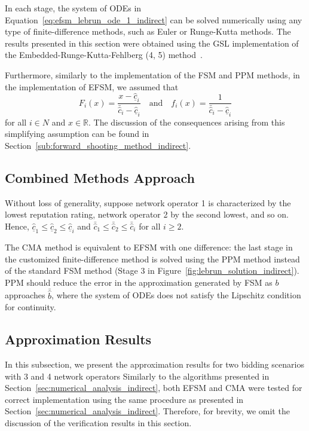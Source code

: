 In each stage, the system of ODEs in Equation~\eqref{eq:efsm_lebrun_ode_1_indirect} can be solved numerically using any type of finite-difference methods, such as Euler or Runge-Kutta methods. The results presented in this section were obtained using the GSL implementation of the Embedded-Runge-Kutta-Fehlberg (4, 5) method~\cite{GSL}.

Furthermore, similarly to the implementation of the FSM and PPM methods, in the implementation of EFSM, we assumed that
\begin{equation*}
  F_i(x) = \frac{x - \underline{\hat{c}}_i}{\bar{\hat{c}}_i - \underline{\hat{c}}_i} \quad\textrm{and}\quad f_i(x) = \frac{1}{\bar{\hat{c}}_i - \underline{\hat{c}}_i}
\end{equation*}
for all $i\in N$ and $x\in\mathbb{R}$. The discussion of the consequences arising from this simplifying assumption can be found in Section~\ref{sub:forward_shooting_method_indirect}.


\subsection{Combined Methods Approach} %
\label{sub:combined_methods_approach_indirect}
Without loss of generality, suppose network operator 1 is characterized by the lowest reputation rating, network operator 2 by the second lowest, and so on. Hence, $\underline{\hat{c}}_1\leq \underline{\hat{c}}_2\leq \underline{\hat{c}}_i$ and $\bar{\hat{c}}_1\leq \bar{\hat{c}}_2\leq \bar{\hat{c}}_i$ for all $i\geq 2$.

The CMA method is equivalent to EFSM with one difference: the last stage in the customized finite-difference method is solved using the PPM method instead of the standard FSM method (Stage 3 in Figure~\ref{fig:lebrun_solution_indirect}). PPM should reduce the error in the approximation generated by FSM as $b$ approaches $\bar{\hat{b}}$, where the system of ODEs does not satisfy the Lipschitz condition for continuity.

\subsection{Approximation Results} %
\label{sub:extended_approximation_results_indirect}
In this subsection, we present the approximation results for two bidding scenarios with 3 and 4 network operators Similarly to the algorithms presented in Section~\ref{sec:numerical_analysis_indirect}, both EFSM and CMA were tested for correct implementation using the same procedure as presented in Section~\ref{sec:numerical_analysis_indirect}. Therefore, for brevity, we omit the discussion of the verification results in this section.

